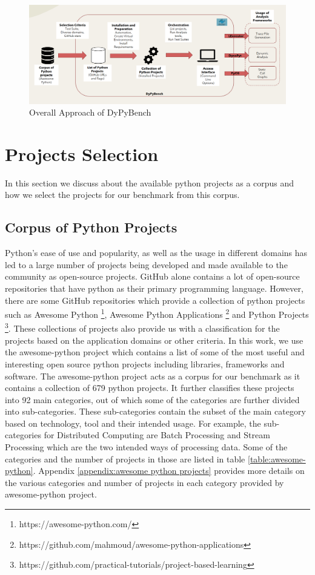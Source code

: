 \begin{figure}[ht]
\centering
\includegraphics[width=1\linewidth]{figures/approach/DyPyBench2.png}
\caption[Approach]{\label{fig:overall_approach}Overall Approach of DyPyBench}
\end{figure}

\section{Projects Selection}
\label{approach:project selection}
In this section we discuss about the available python projects as a corpus and how we select the projects for our benchmark from this corpus.   

\subsection{Corpus of Python Projects}
\label{approach:corpus of python projects}
Python's ease of use and popularity, as well as the usage in different domains has led to a large number of projects being developed and made available to the community as open-source projects.
GitHub alone contains a lot of open-source repositories that have python as their primary programming language.
However, there are some GitHub repositories which provide a collection of python projects such as Awesome Python \footnote{https://awesome-python.com/}, Awesome Python Applications \footnote{https://github.com/mahmoud/awesome-python-applications} and Python Projects \footnote{https://github.com/practical-tutorials/project-based-learning}.
These collections of projects also provide us with a classification for the projects based on the application domains or other criteria.
In this work, we use the awesome-python project which contains a list of some of the most useful and interesting open source python projects including libraries, frameworks and software. 
The awesome-python project acts as a corpus for our benchmark as it contains a collection of 679 python projects.
It further classifies these projects into 92 main categories, out of which some of the categories are further divided into sub-categories.
These sub-categories contain the subset of the main category based on technology, tool and their intended usage.
For example, the sub-categories for Distributed Computing are Batch Processing and Stream Processing which are the two intended ways of processing data.
Some of the categories and the number of projects in those are listed in table \ref{table:awesome-python}. 
Appendix \ref{appendix:awesome python projects} provides more details on the various categories and number of projects in each category provided by awesome-python project.

